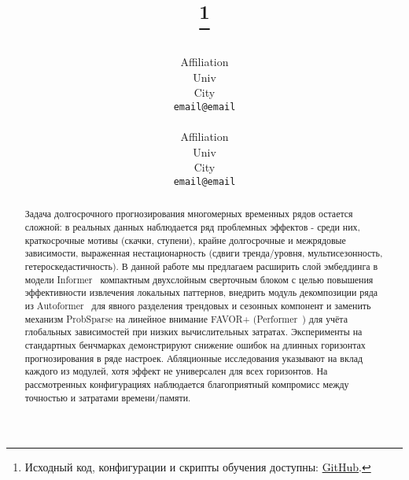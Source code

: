 \pagestyle{fancy}
\thispagestyle{empty}
\rhead{ \textit{ }} 


\title{
    \textbf{\paperName}
    \thanks{Исходный код, конфигурации и скрипты обучения доступны: \href{https://github.com/namenick91/Convformer}{GitHub}.} 
}

\author{
  \studentName \\
  Affiliation \\
  Univ \\
  City\\
  \texttt{email@email} \\
    \And
  \teacherName \\
  Affiliation \\
  Univ \\
  City\\
  \texttt{email@email} \\
}

\maketitle

\begin{abstract}
  Задача долгосрочного прогнозирования многомерных временных рядов остается 
  сложной: в реальных данных наблюдается ряд проблемных эффектов - среди них, 
  краткосрочные мотивы (скачки, ступени), 
  крайне долгосрочные и межрядовые зависимости, выраженная нестационарность 
  (сдвиги тренда/уровня, мультисезонность, гетероскедастичность).
  В данной работе мы предлагаем расширить слой эмбеддинга в модели 
  Informer~\cite{informer} компактным двухслойным сверточным блоком с целью 
  повышения эффективности извлечения локальных паттернов, внедрить модуль
  декомпозиции ряда из Autoformer~\cite{autoformer} для явного разделения 
  трендовых и сезонных компонент и заменить механизм ProbSparse на линейное внимание FAVOR+
  (Performer~\cite{performer}) для учёта глобальных зависимостей при низких 
  вычислительных затратах.
  Эксперименты на стандартных бенчмарках демонстрируют
  снижение ошибок на длинных горизонтах прогнозирования в ряде настроек.
  Абляционные исследования указывают на вклад каждого из модулей, 
  хотя эффект не универсален для всех горизонтов. 
  На рассмотренных конфигурациях наблюдается благоприятный компромисс между точностью 
  и затратами времени/памяти.
\end{abstract}

